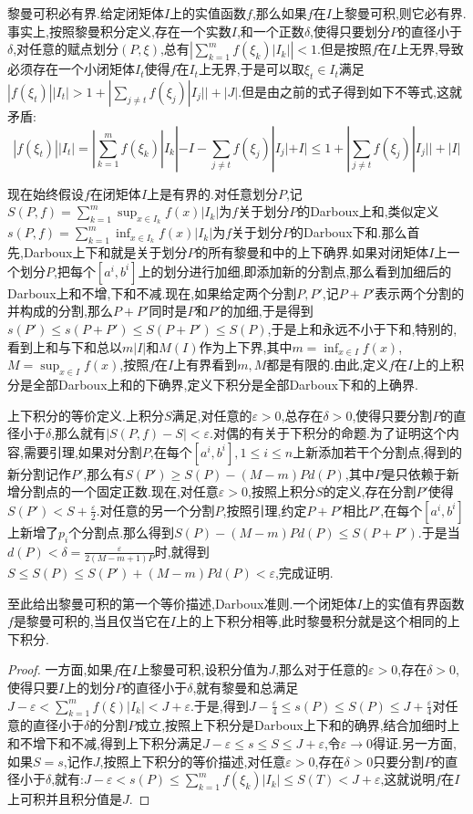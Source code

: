 黎曼可积必有界.给定闭矩体$I$上的实值函数$f$,那么如果$f$在$I$上黎曼可积,则它必有界.事实上,按照黎曼积分定义,存在一个实数$I$,和一个正数$\delta$,使得只要划分$P$的直径小于$\delta$,对任意的赋点划分$(P,\xi)$,总有$\left|\sum_{k=1}^{m}f(\xi_k)|I_k|\right|<1$.但是按照$f$在$I$上无界,导致必须存在一个小闭矩体$I_t$使得$f$在$I_t$上无界,于是可以取$\xi_t\in I_t$满足$|f(\xi_t)||I_t|>1+|\sum_{j\not=t}f(\xi_j)|I_j||+|J|$.但是由之前的式子得到如下不等式,这就矛盾:
$$|f(\xi_t)||I_t|=|\sum_ {k=1}^{m}f(\xi_k)|I_k|-I-\sum_{j\not=t}f(\xi_j)|I_j|+I|\le1+|\sum_{j\not=t}f(\xi_j)|I_j||+|I|$$

现在始终假设$f$在闭矩体$I$上是有界的.对任意划分$P$,记$S(P,f)=\sum_{k=1}^{m}\sup_{x\in I_k}f(x)|I_k|$为$f$关于划分$P$的Darboux上和,类似定义$s(P,f)=\sum_{k=1}^{m}\inf_{x\in I_k}f(x)|I_k|$为$f$关于划分$P$的Darboux下和.那么首先,Darboux上下和就是关于划分$P$的所有黎曼和中的上下确界.如果对闭矩体$I$上一个划分$P$,把每个$[a^i,b^i]$上的划分进行加细,即添加新的分割点,那么看到加细后的Darboux上和不增,下和不减.现在,如果给定两个分割$P,P'$,记$P+P'$表示两个分割的并构成的分割,那么$P+P'$同时是$P$和$P'$的加细,于是得到$s(P')\le s(P+P')\le S(P+P')\le S(P)$,于是上和永远不小于下和,特别的,看到上和与下和总以$m|I|$和$M(I)$作为上下界,其中$m=\inf_{x\in I}f(x)$,$M=\sup_{x\in I}f(x)$,按照$f$在$I$上有界看到$m,M$都是有限的.由此,定义$f$在$I$上的上积分是全部Darboux上和的下确界,定义下积分是全部Darboux下和的上确界.

上下积分的等价定义.上积分$S$满足,对任意的$\varepsilon>0$,总存在$\delta>0$,使得只要分割$P$的直径小于$\delta$,那么就有$|S(P,f)-S|<\varepsilon$.对偶的有关于下积分的命题.为了证明这个内容,需要引理,如果对分割$P$,在每个$[a^i,b^i],1\le i\le n$上新添加若干个分割点,得到的新分割记作$P'$,那么有$S(P')\ge S(P)-(M-m)Pd(P)$,其中$P$是只依赖于新增分割点的一个固定正数.现在,对任意$\varepsilon>0$,按照上积分$S$的定义,存在分割$P'$使得$S(P')<S+\frac{\varepsilon}{2}$.对任意的另一个分割$P$,按照引理,约定$P+P'$相比$P'$,在每个$[a^i,b^i]$上新增了$p_i$个分割点.那么得到$S(P)-(M-m)Pd(P)\le S(P+P')$.于是当$d(P)<\delta=\frac{\varepsilon}{2(M-m+1)P}$时,就得到$S\le S(P)\le S(P')+(M-m)Pd(P)<\varepsilon$,完成证明.

至此给出黎曼可积的第一个等价描述,Darboux准则.一个闭矩体$I$上的实值有界函数$f$是黎曼可积的,当且仅当它在$I$上的上下积分相等,此时黎曼积分就是这个相同的上下积分.
\begin{proof}
	
	一方面,如果$f$在$I$上黎曼可积,设积分值为$J$,那么对于任意的$\varepsilon>0$,存在$\delta>0$,使得只要$I$上的划分$P$的直径小于$\delta$,就有黎曼和总满足$J-\varepsilon<\sum_{k=1}^{m}f(\xi)|I_k|<J+\varepsilon$.于是,得到$J-\frac{\varepsilon}{4}\le s(P)\le S(P)\le J+\frac{\varepsilon}{4}$对任意的直径小于$\delta$的分割$P$成立,按照上下积分是Darboux上下和的确界,结合加细时上和不增下和不减,得到上下积分满足$J-\varepsilon\le s\le S\le J+\varepsilon$,令$\varepsilon\to0$得证.另一方面,如果$S=s$,记作$J$,按照上下积分的等价描述,对任意$\varepsilon>0$,存在$\delta>0$只要分割$P$的直径小于$\delta$,就有:$J-\varepsilon<s(P)\le\sum_{k=1}^{m}f(\xi_k)|I_k|\le S(T)<J+\varepsilon$,这就说明$f$在$I$上可积并且积分值是$J$.
	
\end{proof}

